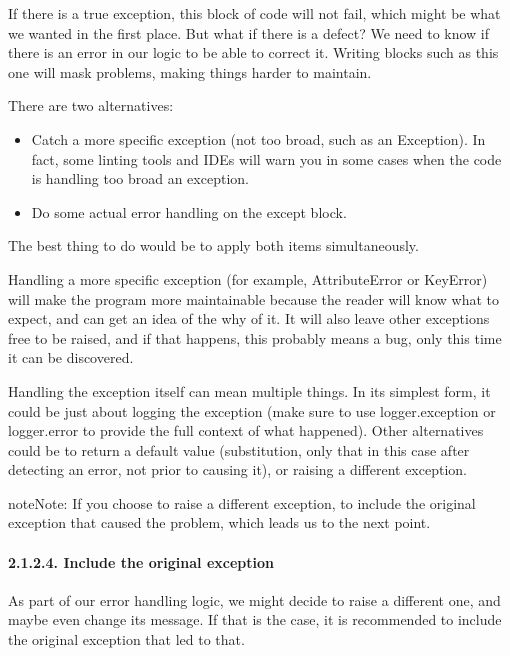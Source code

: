 \documentclass[a4paper,10pt,english]{sphinxmanual}
\begin{document}
If there is a true exception, this block of code will not fail, which might be what we wanted in the first
place. But what if there is a defect? We need to know if there is an error in our logic to be able to correct
it. Writing blocks such as this one will mask problems, making things harder to maintain.

There are two alternatives:
\begin{itemize}
\item {} 
Catch a more specific exception (not too broad, such as an Exception). In fact, some linting tools and IDEs will warn you in some cases when the code is handling too broad an exception.

\item {} 
Do some actual error handling on the except block.

\end{itemize}

The best thing to do would be to apply both items simultaneously.

Handling a more specific exception (for example, AttributeError or KeyError) will make the program more
maintainable because the reader will know what to expect, and can get an idea of the why of it. It will also
leave other exceptions free to be raised, and if that happens, this probably means a bug, only this time it
can be discovered.

Handling the exception itself can mean multiple things. In its simplest form, it could be just about logging
the exception (make sure to use logger.exception or logger.error to provide the full context of what
happened). Other alternatives could be to return a default value (substitution, only that in this case after
detecting an error, not prior to causing it), or raising a different exception.

\begin{sphinxadmonition}{note}{Note:}
If you choose to raise a different exception, to include the original exception that caused the problem,
which leads us to the next point.
\end{sphinxadmonition}


\paragraph{2.1.2.4. Include the original exception}
\label{\detokenize{chapters/3_general_traits/index:include-the-original-exception}}
As part of our error handling logic, we might decide to raise a different one, and maybe even change its
message. If that is the case, it is recommended to include the original exception that led to that.
\end{document}
